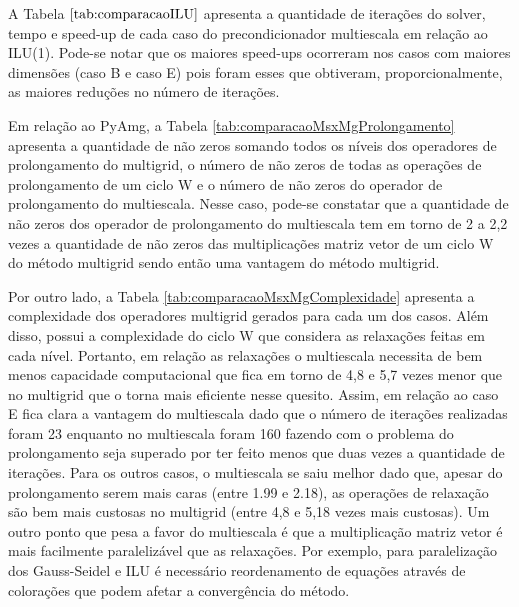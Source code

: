 A Tabela $\ref{tab:comparacaoILU}$ apresenta a quantidade de iterações do solver, tempo e speed-up de cada caso do precondicionador multiescala em relação ao ILU(1). Pode-se notar que os maiores speed-ups ocorreram nos casos com maiores dimensões (caso B e caso E) pois foram esses que obtiveram, proporcionalmente, as maiores reduções no número de iterações.

Em relação ao PyAmg, a Tabela \ref{tab:comparacaoMsxMgProlongamento} apresenta a quantidade de não zeros somando todos os níveis dos operadores de prolongamento do multigrid, o número de não zeros de todas as operações de prolongamento de um ciclo W e o número de não zeros do operador de prolongamento do multiescala. Nesse caso, pode-se constatar que a quantidade de não zeros dos operador de prolongamento do multiescala tem em torno de 2 a 2,2 vezes a quantidade de não zeros das multiplicações matriz vetor de um ciclo W do método multigrid sendo então uma vantagem do método multigrid.

Por outro lado, a Tabela \ref{tab:comparacaoMsxMgComplexidade} apresenta a complexidade dos operadores multigrid gerados para cada um dos casos. Além disso, possui a complexidade do ciclo W que considera as relaxações feitas em cada nível. Portanto, em relação as relaxações o multiescala necessita de bem menos capacidade computacional que fica em torno de 4,8 e 5,7 vezes menor que no multigrid que o torna mais eficiente nesse quesito. 
Assim, em relação ao caso E fica clara a vantagem do multiescala dado que o número de iterações realizadas foram 23 enquanto no multiescala foram 160 fazendo com o problema do prolongamento seja superado por ter feito menos que duas vezes a quantidade de iterações. Para os outros casos, o multiescala se saiu melhor dado que, apesar do prolongamento serem mais caras (entre 1.99 e 2.18), as operações de relaxação são bem mais custosas no multigrid (entre 4,8 e 5,18 vezes mais custosas). Um outro ponto que pesa a favor do multiescala é que a multiplicação matriz vetor é mais facilmente paralelizável que as relaxações. Por exemplo, para paralelização dos Gauss-Seidel e ILU é necessário reordenamento de equações através de colorações que podem afetar a convergência do método.




